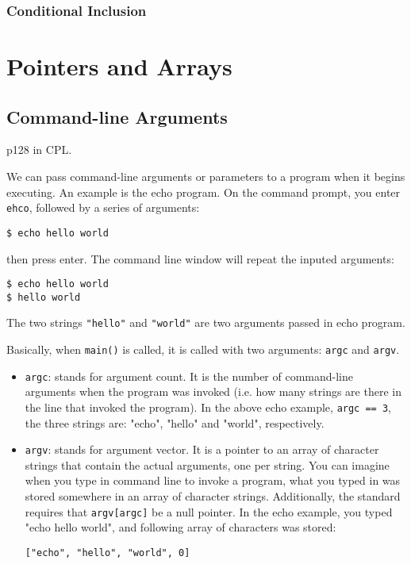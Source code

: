 \documentclass[12pt]{article}
\begin{document}
\subsubsection{Conditional Inclusion}
\label{sec:orgc5cb3df}
\section{Pointers and Arrays}
\label{sec:org4126d2c}
\subsection{Command-line Arguments}
\label{sec:orgde8c3a5}
p128 in CPL.

We can pass command-line arguments or parameters to a program when it begins executing. An example is the echo program. On the command prompt, you enter \texttt{ehco}, followed by a series of arguments:
\begin{verbatim}
$ echo hello world
\end{verbatim}
then press enter. The command line window will repeat the inputed arguments:
\begin{verbatim}
$ echo hello world
$ hello world
\end{verbatim}
The two strings \texttt{"hello"} and \texttt{"world"} are two arguments passed in echo program.

Basically, when \texttt{main()} is called, it is called with two arguments: \texttt{argc} and \texttt{argv}.
\begin{itemize}
\item \texttt{argc}: stands for argument count. It is the number of command-line arguments when the program was invoked (i.e. how many strings are there in the line that invoked the program). In the above echo example, \texttt{argc == 3}, the three strings are: "echo", "hello" and "world", respectively.
\item \texttt{argv}: stands for argument vector. It is a pointer to an array of character strings that contain the actual arguments, one per string. You can imagine when you type in command line to invoke a program, what you typed in was stored somewhere in an array of character strings. Additionally, the standard requires that \texttt{argv[argc]} be a null pointer. In the echo example, you typed "echo hello world", and following array of characters was stored:
\begin{verbatim}
["echo", "hello", "world", 0]
\end{verbatim}
\end{itemize}
\end{document}
